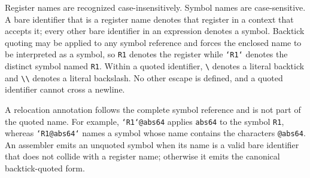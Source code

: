 Register names are recognized case-insensitively. Symbol names are case-sensitive. A bare identifier that is a
register name denotes that register in a context that accepts it; every other bare identifier in an expression
denotes a symbol. Backtick quoting may be applied to any symbol reference and forces the enclosed name to
be interpreted as a symbol, so \texttt{R1} denotes the register while \texttt{`R1`} denotes the distinct symbol named
\texttt{R1}. Within a quoted identifier, \texttt{\textbackslash\textasciigrave} denotes a literal backtick and
\texttt{\textbackslash\textbackslash} denotes a literal backslash. No other escape is defined, and a quoted
identifier cannot cross a newline.

A relocation annotation follows the complete symbol reference and is not part of the quoted name. For example,
\texttt{`R1`@abs64} applies \texttt{abs64} to the symbol \texttt{R1}, whereas \texttt{`R1@abs64`} names a symbol
whose name contains the characters \texttt{@abs64}. An assembler emits an unquoted symbol when its name is a valid
bare identifier that does not collide with a register name; otherwise it emits the canonical backtick-quoted
form.
